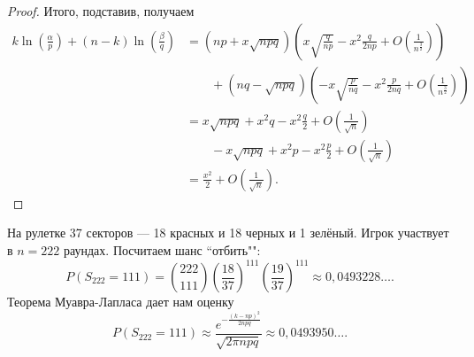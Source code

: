 \begin{proof}
    Итого, подставив, получаем
   \begin{align*}
       k\ln\left(\frac{\alpha}{p}\right) + (n - k)\ln\left(\frac{\beta}{q}\right) &= (np + x\sqrt{npq})\left(x\sqrt{\frac{q}{np}} - x^2 \frac{q}{2np}
        + O\left(\frac{1}{n^\frac{3}{2}}\right)\right) \\& \quad\quad + (nq - \sqrt{npq})\left(-x\sqrt{\frac{p}{nq}} - x^2 \frac{p}{2nq}
        + O\left(\frac{1}{n^\frac{3}{2}}\right)\right) \\&= x\sqrt{npq} + x^2q - x^2\frac{q}{2} + O\left(\frac{1}{\sqrt{n}}\right) \\& \quad\quad - x\sqrt{npq}
        +x^2p-x^2\frac{p}{2} + O\left(\frac{1}{\sqrt{n}}\right) \\&= \frac{x^2}{2} + O\left(\frac{1}{\sqrt{n}}\right).
   \end{align*}
  

\end{proof}

\begin{example}На рулетке 37 секторов --- 18 красных и 18 черных и 1 зелёный. Игрок участвует в $n = 222$ раундах. Посчитаем шанс ``отбить"":
    $$P(S_{222} = 111) = \binom{222}{111}(\frac{18}{37})^{111}(\frac{19}{37})^{111} \approx 0,0493228\ldots.$$
    Теорема Муавра-Лапласа дает нам оценку
   $$ P(S_{222} = 111)\approx \frac{e^{-\frac{(k - np)^2}{2npq}}}{\sqrt{2\pi npq}}\approx 0,0493950\ldots.$$
\end{example}
\newpage
